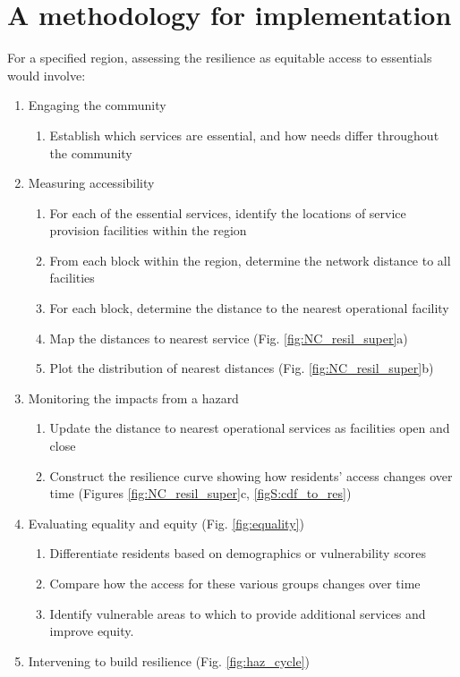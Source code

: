 \documentclass[onecolumn,doublespacing]{risa}
\begin{document}
\section{A methodology for implementation}
For a specified region, assessing the resilience as equitable access to essentials would involve: 
\begin{enumerate}[topsep=1pt,itemsep=0em,partopsep=1ex,parsep=1ex]
    \item Engaging the community 
    \begin{enumerate}[topsep=0pt,itemsep=-2pt,partopsep=1ex,parsep=1ex]
        \item Establish which services are essential, and how needs differ throughout the community
    \end{enumerate}
    \item Measuring accessibility
    \begin{enumerate}[topsep=0pt,itemsep=-2pt,partopsep=1ex,parsep=1ex]
        \item For each of the essential services, identify the locations of service provision facilities within the region
        \item From each block within the region, determine the network distance to all facilities
        \item For each block, determine the distance to the nearest operational facility
        \item Map the distances to nearest service (Fig. \ref{fig:NC_resil_super}a)
        \item Plot the distribution of nearest distances (Fig. \ref{fig:NC_resil_super}b)
    \end{enumerate}
    \item Monitoring the impacts from a hazard
    \begin{enumerate}[topsep=0pt,itemsep=-2pt,partopsep=1ex,parsep=1ex]
        \item Update the distance to nearest operational services as facilities open and close
        \item Construct the resilience curve showing how residents' access changes over time (Figures \ref{fig:NC_resil_super}c, \ref{figS:cdf_to_res})
    \end{enumerate}
    \item Evaluating equality and equity (Fig. \ref{fig:equality})
    \begin{enumerate}[topsep=0pt,itemsep=-2pt,partopsep=1ex,parsep=1ex]
        \item Differentiate residents based on demographics or vulnerability scores
        \item Compare how the access for these various groups changes over time
        \item Identify vulnerable areas to which to provide additional services and improve equity.
    \end{enumerate}
    \item Intervening to build resilience (Fig. \ref{fig:haz_cycle})
\end{enumerate}
\end{document}
